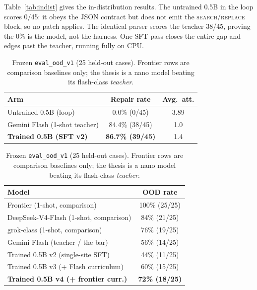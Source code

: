 \documentclass[10pt,twocolumn]{article}
\newcommand{\best}[1]{\textbf{#1}}
\begin{document}
Table~\ref{tab:indist} gives the in-distribution results. The untrained 0.5B in
the loop scores 0/45: it obeys the JSON contract but does not emit the
\textsc{search}/\textsc{replace} block, so no patch applies. The identical parser
scores the teacher 38/45, proving the 0\% is the model, not the harness. One SFT
pass closes the entire gap and edges past the teacher, running fully on CPU.

\begin{table}[t]
\centering
\small
\begin{minipage}[t]{0.46\textwidth}
\centering
\caption{Frozen \texttt{eval\_v1} (45 in-distribution cases). All arms use the
identical controller and \texttt{cargo check} verifier.}
\label{tab:indist}
\begin{tabular}{@{}lcc@{}}
\toprule
Arm & Repair rate & Avg.\ att. \\
\midrule
Untrained 0.5B (loop)        & 0.0\% (0/45)  & 3.89 \\
Gemini Flash (1-shot teacher) & 84.4\% (38/45) & 1.0 \\
\best{Trained 0.5B (SFT v2)} & \best{86.7\% (39/45)} & 1.4 \\
\bottomrule
\end{tabular}
\end{minipage}\hfill
\begin{minipage}[t]{0.5\textwidth}
\centering
\caption{Frozen \texttt{eval\_ood\_v1} (25 held-out cases). Frontier rows are
comparison baselines only; the thesis is a nano model beating its flash-class
\emph{teacher}.}
\label{tab:ood}
\begin{tabular}{@{}lc@{}}
\toprule
Model & OOD rate \\
\midrule
Frontier (1-shot, comparison)          & 100\% (25/25) \\
DeepSeek-V4-Flash (1-shot, comparison) & 84\% (21/25) \\
grok-class (1-shot, comparison)        & 76\% (19/25) \\
Gemini Flash (teacher / the bar)       & 56\% (14/25) \\
Trained 0.5B v2 (single-site SFT)      & 44\% (11/25) \\
Trained 0.5B v3 (+ Flash curriculum)   & 60\% (15/25) \\
\best{Trained 0.5B v4 (+ frontier curr.)} & \best{72\% (18/25)} \\
\bottomrule
\end{tabular}
\end{minipage}
\end{table}
\end{document}
